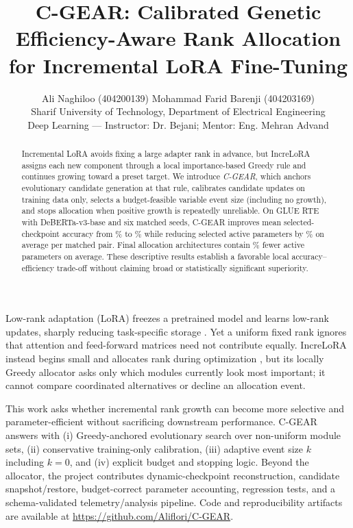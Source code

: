 \documentclass[10pt,twocolumn]{article}
\title{\vspace{-1.2em}\textbf{C-GEAR: Calibrated Genetic Efficiency-Aware Rank Allocation\\for Incremental LoRA Fine-Tuning}\vspace{-0.45em}}
\author{\small Ali Naghiloo (404200139) \quad Mohammad Farid Barenji (404203169)\\[-1pt]
\footnotesize Sharif University of Technology, Department of Electrical Engineering\\[-1pt]
\footnotesize Deep Learning --- Instructor: Dr. Bejani; Mentor: Eng. Mehran Advand}
\date{\vspace{-1.1em}}
\makeatletter
\renewcommand\section{\@startsection{section}{1}{\z@}{4pt plus 1pt minus 1pt}{2pt}{\normalfont\bfseries\small}}
\makeatother
\begin{document}
\maketitle
\vspace{-1.35em}

\begin{abstract}
Incremental LoRA avoids fixing a large adapter rank in advance, but IncreLoRA assigns each new component through a local importance-based Greedy rule and continues growing toward a preset target. We introduce \emph{C-GEAR}, which anchors evolutionary candidate generation at that rule, calibrates candidate updates on training data only, selects a budget-feasible variable event size (including no growth), and stops allocation when positive growth is repeatedly unreliable. On GLUE RTE with DeBERTa-v3-base and six matched seeds, C-GEAR improves mean selected-checkpoint accuracy from \GreedyAccuracy\% to \CgearAccuracy\% while reducing selected active parameters by \SelectedPairedReduction\% on average per matched pair. Final allocation architectures contain \FinalPairedReduction\% fewer active parameters on average. These descriptive results establish a favorable local accuracy--efficiency trade-off without claiming broad or statistically significant superiority.
\end{abstract}

\section{Introduction}
Low-rank adaptation (LoRA) freezes a pretrained model and learns low-rank updates, sharply reducing task-specific storage \cite{hu2022lora}. Yet a uniform fixed rank ignores that attention and feed-forward matrices need not contribute equally. IncreLoRA instead begins small and allocates rank during optimization \cite{zhang2023increlora}, but its locally Greedy allocator asks only which modules currently look most important; it cannot compare coordinated alternatives or decline an allocation event.

This work asks whether incremental rank growth can become more selective and parameter-efficient without sacrificing downstream performance. C-GEAR answers with (i) Greedy-anchored evolutionary search over non-uniform module sets, (ii) conservative training-only calibration, (iii) adaptive event size $k$ including $k=0$, and (iv) explicit budget and stopping logic. Beyond the allocator, the project contributes dynamic-checkpoint reconstruction, candidate snapshot/restore, budget-correct parameter accounting, regression tests, and a schema-validated telemetry/analysis pipeline. Code and reproducibility artifacts are available at \url{https://github.com/Aliflori/C-GEAR}.
\end{document}
